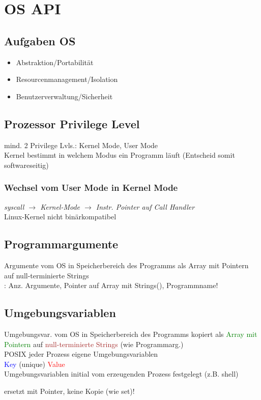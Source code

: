 \section{OS API}
\subsection{Aufgaben OS}
\begin{itemize}
    \item Abstraktion/Portabilität
    \item Resourcenmanagement/Isolation
    \item Benutzerverwaltung/Sicherheit
\end{itemize}
\subsection{Prozessor Privilege Level}
mind. 2 Privilege Lvls.: Kernel Mode, User Mode\\
Kernel bestimmt in welchem Modus ein Programm läuft (Entscheid somit softwareseitig)

\subsubsection{Wechsel vom User Mode in Kernel Mode}
\textit{syscall $\rightarrow$ Kernel-Mode $\rightarrow$ Instr. Pointer auf Call Handler\\}
Linux-Kernel nicht binärkompatibel

\subsection{Programmargumente}
Argumente vom OS in Speicherbereich des Programms als Array mit Pointern auf null-terminierte Strings\\
:  Anz. Argumente,  Pointer auf Array mit Strings(),  Programmname!

\subsection{Umgebungsvariablen}
Umgebungsvar. vom OS in Speicherbereich des Programms kopiert als \textcolor{green}{Array mit Pointern} auf \textcolor{brown}{null-terminierte Strings} (wie Programmarg.)\\
POSIX jeder Prozess eigene Umgebungsvariablen\\
\textcolor{blue}{Key} (unique) \textcolor{red}{Value}\\
Umgebungsvariablen initial vom erzeugenden Prozess festgelegt (z.B. shell)

 ersetzt mit Pointer, keine Kopie (wie set)!